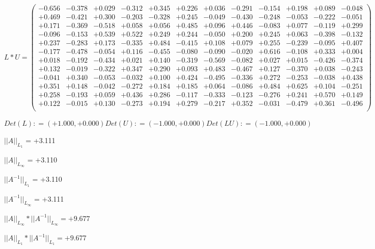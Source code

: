 \documentclass[9pt]{article}
\theoremstyle{plain}
\theoremstyle{definition}
\theoremstyle{remark}
\numberwithin{equation}{section}
\begin{document}
$L * U  = \left(
\begin{array}{
cccccccccccc}
-0.656 & -0.378 & +0.029 & -0.312 & +0.345 & +0.226 & +0.036 & -0.291 & -0.154 & +0.198 & +0.089 & -0.048 \\
+0.469 & -0.421 & +0.300 & -0.203 & -0.328 & +0.245 & -0.049 & -0.430 & -0.248 & -0.053 & -0.222 & -0.051 \\
+0.171 & -0.369 & -0.518 & +0.058 & +0.056 & +0.485 & +0.096 & +0.446 & -0.083 & +0.077 & -0.119 & +0.299 \\
-0.096 & -0.153 & +0.539 & +0.522 & +0.249 & +0.244 & -0.050 & +0.200 & +0.245 & +0.063 & -0.398 & -0.132 \\
+0.237 & -0.283 & +0.173 & -0.335 & +0.484 & -0.415 & +0.108 & +0.079 & +0.255 & -0.239 & -0.095 & +0.407 \\
-0.177 & -0.478 & -0.054 & +0.116 & -0.455 & -0.080 & -0.090 & -0.020 & +0.616 & -0.108 & +0.333 & +0.004 \\
+0.018 & -0.192 & -0.434 & +0.021 & +0.140 & -0.319 & -0.569 & -0.082 & +0.027 & +0.015 & -0.426 & -0.374 \\
+0.132 & -0.019 & -0.322 & +0.347 & +0.290 & +0.093 & +0.483 & -0.467 & +0.127 & -0.370 & +0.038 & -0.243 \\
-0.041 & +0.340 & -0.053 & -0.032 & +0.100 & +0.424 & -0.495 & -0.336 & +0.272 & -0.253 & -0.038 & +0.438 \\
+0.351 & +0.148 & -0.042 & -0.272 & +0.184 & +0.185 & +0.064 & -0.086 & +0.484 & +0.625 & +0.104 & -0.251 \\
+0.258 & -0.193 & +0.059 & +0.436 & +0.286 & -0.117 & -0.333 & -0.123 & -0.276 & +0.241 & +0.570 & +0.149 \\
+0.122 & -0.015 & +0.130 & -0.273 & +0.194 & +0.279 & -0.217 & +0.352 & -0.031 & -0.479 & +0.361 & -0.496 \\
\end{array}
\right)$ \newline 

$Det(L) :    = (+1.000,+0.000)     Det(U) :    = (-1.000,+0.000)     Det(LU) :    = (-1.000,+0.000)$

$||A||_{L_1}$  = +3.111

$||A||_{L_{\infty}}$ = +3.110

$||A^{-1}||_{L_1}$  = +3.110

$||A^{-1}||_{L_{\infty}}$ = +3.111

$||A||_{L_{\infty}} * ||A^{-1}||_{L_{\infty}} = +9.677$

$||A||_{L_1} * ||A^{-1}||_{L_1} = +9.677$
\end{document}
